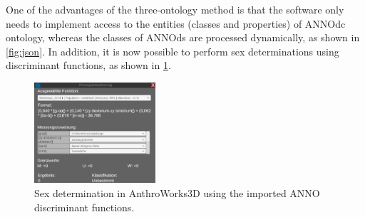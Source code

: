 \documentclass[sw]{iosart2x}
\newcommand{\aw}{AnthroWorks3D}
\begin{document}
One of the advantages of the three-ontology method is that the software only needs to implement access to the entities (classes and properties) of ANNOdc ontology, whereas the classes of ANNOds are processed dynamically, as shown in \cref{fig:json}.
%
In addition, it is now possible to perform sex determinations using discriminant functions, as shown in \cref{fig:function}.

\begin{figure}[h]
\includegraphics[width=0.4\textwidth]{img/function.png}
\caption{Sex determination in \aw{} using the imported ANNO discriminant functions.}
\label{fig:function}
\end{figure}
\end{document}
